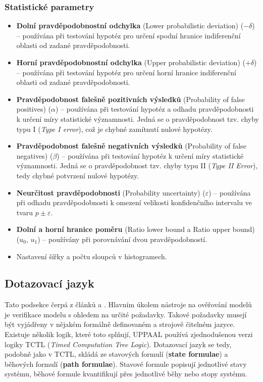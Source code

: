 \subsubsection{Statistické parametry}
\begin{itemize}
    \item \textbf{Dolní pravděpodobnostní odchylka} (Lower probabilistic deviation) ($-\delta$) -- používána při testování hypotéz pro určení spodní hranice indiferenční oblasti od zadané pravděpodobnosti.
    \item \textbf{Horní pravděpodobnostní odchylka} (Upper probabilistic deviation) ($+\delta$) -- používána při testování hypotéz pro určení horní hranice indiferenční oblasti od zadané pravděpodobnosti.
    \item \textbf{Pravděpodobnost falešně pozitivních výsledků} (Probability of false positives) ($\alpha$) -- používána při testování hypotéz a odhadu pravděpodobnosti k určení míry statistické významnosti. Jedná se o pravděpodobnost tzv. chyby typu I (\textit{Type I error}), což je chybné zamítnutí nulové hypotézy.
    \item \textbf{Pravděpodobnost falešně negativních výsledků} (Probability of false negatives) ($\beta$) -- používána při testování hypotéz k určení míry statistické významnosti. Jedná se o pravděpodobnost tzv. chyby typu II (\textit{Type II Error}), tedy chybné potvrzení nulové hypotézy.
    \item \textbf{Neurčitost pravděpodobnosti} (Probability uncertainty) ($\varepsilon$) -- používána při odhadu pravděpodobnosti k omezení velikosti konfidenčního intervalu ve tvaru $p \pm \varepsilon$.
    \item \textbf{Dolní a horní hranice poměru} (Ratio lower bound a Ratio upper bound) ($u_0$, $u_1$) -- používány při porovnávání dvou pravděpodobností.
    \item Nastavení šířky a počtu sloupců v histogramech.
\end{itemize}

\subsection{Dotazovací jazyk} \label{uppaal_query_lang}
Tato podsekce čerpá z článků \cite{uppaal_intro} a \cite{uppaal_smc}. Hlavním úkolem nástroje na ověřování modelů je verifikace modelu s ohledem na určité požadavky. Takové požadavky musejí být vyjádřeny v nějakém formálně definovaném a strojově čitelném jazyce. Existuje několik logik, které toto splňují, UPPAAL používá zjednodušenou verzi logiky TCTL (\textit{Timed Computation Tree Logic}). Dotazovací jazyk se tedy, podobně jako v TCTL, skládá ze stavových formulí (\textbf{state formulae}) a běhových formulí (\textbf{path formulae}). Stavové formule popisují jednotlivé stavy systému, běhové formule kvantifikují přes jednotlivé běhy nebo stopy systému.

